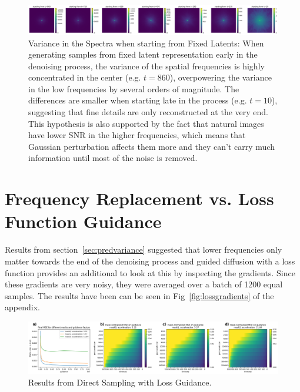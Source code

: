 \begin{figure}[h]
    \centering
    \includegraphics[width=\textwidth]{images/fixedlatents_varSpectra.png}
    \caption[Spectral Variance from Fixed Latents]{Variance in the Spectra when starting from Fixed Latents: When generating samples from fixed latent representation early in the denoising process, the variance of the spatial frequencies is highly concentrated in the center (e.g. $t=860$), overpowering the variance in the low frequencies by several orders of magnitude. The differences are smaller when starting late in the process (e.g. $t=10$), suggesting that fine details are only reconstructed at the very end. This hypothesis is also supported by the fact that natural images have lower SNR in the higher frequencies, which means that Gaussian perturbation affects them more and they can't carry much information until most of the noise is removed.}
    \label{fig:spectralvariance}
\end{figure}
\section{Frequency Replacement vs. Loss Function Guidance}
Results from section~\ref{sec:predvariance} suggested that lower frequencies only matter towards the end of the denoising process and guided diffusion with a loss function provides an additional to look at this by inspecting the gradients. Since these gradients are very noisy, they were averaged over a batch of 1200 equal samples. The results have been can be seen in Fig~\ref{fig:lossgradients} of the appendix.

\begin{figure}[h]
    \centering
    \includegraphics[width=\textwidth]{images/direct_sampling.png}
    \caption[Direct Sampling with Loss Guidance]{Results from Direct Sampling with Loss Guidance.}
\end{figure}